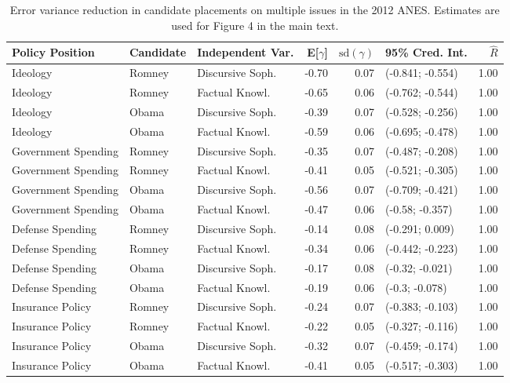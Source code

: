 \begin{table}[ht]
\centering
\caption{Error variance reduction in candidate placements on multiple issues in the 2012 ANES. 
         Estimates are used for Figure 4 in the main text.} 
\label{app:hetreg2012}
\begin{tabular}{lllrrlr}
  \hline
Policy Position & Candidate & Independent Var. & E[$\gamma$] & $\text{sd}(\gamma)$ & 95\% Cred. Int. & $\hat{R}$ \\ 
  \hline
Ideology & Romney & Discursive Soph. & -0.70 & 0.07 & (-0.841; -0.554) & 1.00 \\ 
  Ideology & Romney & Factual Knowl. & -0.65 & 0.06 & (-0.762; -0.544) & 1.00 \\ 
  Ideology & Obama & Discursive Soph. & -0.39 & 0.07 & (-0.528; -0.256) & 1.00 \\ 
  Ideology & Obama & Factual Knowl. & -0.59 & 0.06 & (-0.695; -0.478) & 1.00 \\ 
  Government Spending & Romney & Discursive Soph. & -0.35 & 0.07 & (-0.487; -0.208) & 1.00 \\ 
  Government Spending & Romney & Factual Knowl. & -0.41 & 0.05 & (-0.521; -0.305) & 1.00 \\ 
  Government Spending & Obama & Discursive Soph. & -0.56 & 0.07 & (-0.709; -0.421) & 1.00 \\ 
  Government Spending & Obama & Factual Knowl. & -0.47 & 0.06 & (-0.58; -0.357) & 1.00 \\ 
  Defense Spending & Romney & Discursive Soph. & -0.14 & 0.08 & (-0.291; 0.009) & 1.00 \\ 
  Defense Spending & Romney & Factual Knowl. & -0.34 & 0.06 & (-0.442; -0.223) & 1.00 \\ 
  Defense Spending & Obama & Discursive Soph. & -0.17 & 0.08 & (-0.32; -0.021) & 1.00 \\ 
  Defense Spending & Obama & Factual Knowl. & -0.19 & 0.06 & (-0.3; -0.078) & 1.00 \\ 
  Insurance Policy & Romney & Discursive Soph. & -0.24 & 0.07 & (-0.383; -0.103) & 1.00 \\ 
  Insurance Policy & Romney & Factual Knowl. & -0.22 & 0.05 & (-0.327; -0.116) & 1.00 \\ 
  Insurance Policy & Obama & Discursive Soph. & -0.32 & 0.07 & (-0.459; -0.174) & 1.00 \\ 
  Insurance Policy & Obama & Factual Knowl. & -0.41 & 0.05 & (-0.517; -0.303) & 1.00 \\ 

\end{tabular}
\end{table}
